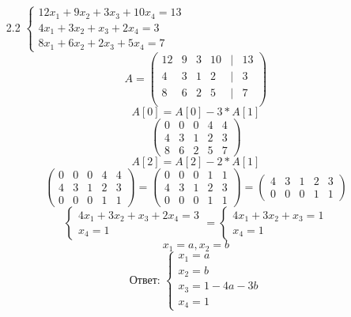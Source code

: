 \documentclass[a4paper]{article}
\newcommand{\mat}[1]{\begin{pmatrix} #1 \end{pmatrix}}
\begin{document}
\begin{enumerate}
\begin{enumerate}
        \item[2.2]
        $\begin{cases}
            12x_1 + 9x_2 +3x_3 +10x_4 = 13 \\
            4x_1 + 3x_2 + x_3 + 2x_4 = 3 \\
            8x_1 + 6x_2 + 2x_3 + 5x_4 = 7 
        \end{cases}$
        \[A = \mat{
            12 & 9 & 3 & 10 & | & 13 \\
            4 & 3 & 1 & 2 & | & 3 \\
            8 & 6 & 2 & 5 & | & 7 \\
        }\]
        \[A[0] = A[0] - 3*A[1]\]
        \[\begin{pmatrix}
            0 & 0 & 0 & 4 & 4 \\
            4 & 3 & 1 & 2 & 3 \\
            8 & 6 & 2 & 5 & 7
        \end{pmatrix}\]
        \[A[2] = A[2] - 2*A[1]\]
        \[\mat{
            0 & 0 & 0 & 4 & 4 \\
            4 & 3 & 1 & 2 & 3 \\
            0 & 0 & 0 & 1 & 1
        }=\mat{
            0 & 0 & 0 & 1 & 1 \\
            4 & 3 & 1 & 2 & 3 \\
            0 & 0 & 0 & 1 & 1
        }=\mat{
            4 & 3 & 1 & 2 & 3 \\
            0 & 0 & 0 & 1 & 1
        }\]
        \[\begin{cases}
            4x_1 + 3x_2 + x_3 + 2x_4 = 3 \\
            x_4 = 1
        \end{cases}=
        \begin{cases}
            4x_1 + 3x_2 + x_3 = 1 \\
            x_4 = 1
        \end{cases}\]
        \[x_1 = a, x_2 = b\]
        \[\textbf{Ответ: }\begin{cases}
            x_1 = a\\
            x_2 = b\\
            x_3 = 1-4a-3b\\
            x_4 = 1
        \end{cases}\]


\end{enumerate}
\end{enumerate}
\end{document}
